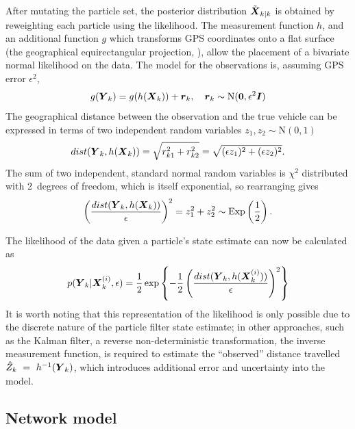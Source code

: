 After mutating the particle set, the posterior distribution $\tilde{\mbox{$\boldsymbol{X}$}}_{k|k}$ 
is obtained by reweighting each particle using the likelihood.
The measurement function $h$,
and an additional function $g$ which transforms GPS coordinates onto a flat
surface (the geographical equirectangular projection, \cite{Snyder_1998}),
allow the placement of a bivariate normal likelihood on the data.
The model for the observations is,
assuming GPS error $\epsilon^2$,
\begin{equation*}
\label{eq:pf_obs_model}
g(\mbox{$\boldsymbol{Y}$}_k) = g(h(\mbox{$\boldsymbol{X}$}_k)) + \boldsymbol{r}_k,
\quad \boldsymbol{r}_k \sim \mathrm{N}(\boldsymbol{0}, \epsilon^2\boldsymbol{I})
\end{equation*}
The geographical distance between the observation and the true vehicle can be expressed
in terms of two independent random variables $z_1, z_2 \sim \mathrm{N}(0,1)$
\begin{equation*}
\label{eq:obs_dist}
dist(\mbox{$\boldsymbol{Y}$}_k, h(\mbox{$\boldsymbol{X}$}_k)) = \sqrt{r_{k1}^2 + r_{k2}^2} 
    = \sqrt{(\epsilon z_1)^2 + (\epsilon z_2)^2}.
\end{equation*}
The sum of two independent, standard normal random variables 
is $\chi^2$ distributed with 2~degrees of freedom,
which is itself exponential,
so rearranging gives
\begin{equation*}
\label{eq:obs_exp}
\left(\frac{dist(\mbox{$\boldsymbol{Y}$}_k, h(\mbox{$\boldsymbol{X}$}_k))}{\epsilon}\right)^2 =
z_1^2 + z_2^2 \sim \mathrm{Exp}\left(\frac{1}{2}\right).
\end{equation*}


The likelihood of the data given a particle's state estimate 
can now be calculated as
\begin{equation*}
p(\mbox{$\boldsymbol{Y}$}_k | \mbox{$\boldsymbol{X}$}_k^{(i)}, \epsilon) =
\frac{1}{2}\exp\left\{
-\frac{1}{2} \left(\frac{dist(\mbox{$\boldsymbol{Y}$}_k, h(\mbox{$\boldsymbol{X}$}_k^{(i)}))}{\epsilon}\right)^2
\right\}
\end{equation*}
It is worth noting that this representation of the likelihood is only
possible due to the discrete nature of the particle filter state estimate;
in other approaches, such as the Kalman filter,
a reverse non-deterministic transformation,
the inverse measurement function,
is required to estimate the ``observed'' distance travelled $\hat Z_k~=~h^{-1}(\mbox{$\boldsymbol{Y}$}_k)$, 
which introduces additional error and uncertainty into the model.



\subsection{Network model}
\label{sec:kf}


